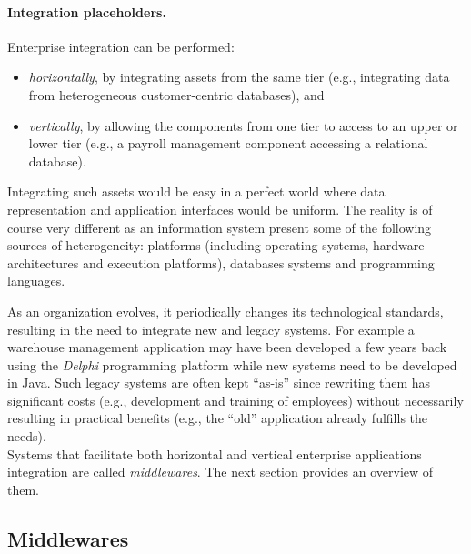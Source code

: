 \paragraph{Integration placeholders.}
Enterprise integration can be performed:
\begin{itemize}

	\item \emph{horizontally}, by integrating assets from the same tier (e.g., integrating data from heterogeneous customer-centric databases), and
	
	\item \emph{vertically}, by allowing the components from one tier to access to an upper or lower tier (e.g., a payroll management component accessing a relational database).

\end{itemize}
Integrating such assets would be easy in a perfect world where data representation and application interfaces would be uniform. The reality is of course very different as an information system present some of the following sources of heterogeneity: platforms (including operating systems, hardware architectures and execution platforms), databases systems and programming languages.

As an organization evolves, it periodically changes its technological standards, resulting in the need to  integrate new and legacy systems. For example a warehouse management application may have been developed a few years back using the \emph{Delphi} programming platform while new systems need to be developed in Java. Such legacy systems are often kept ``as-is'' since rewriting them has significant costs (e.g., development and training of employees) without necessarily resulting in practical benefits (e.g., the ``old'' application already fulfills the needs). \\

Systems that facilitate both horizontal and vertical enterprise applications integration are called \emph{middlewares}. The next section provides an overview of them.


\subsection{Middlewares}


